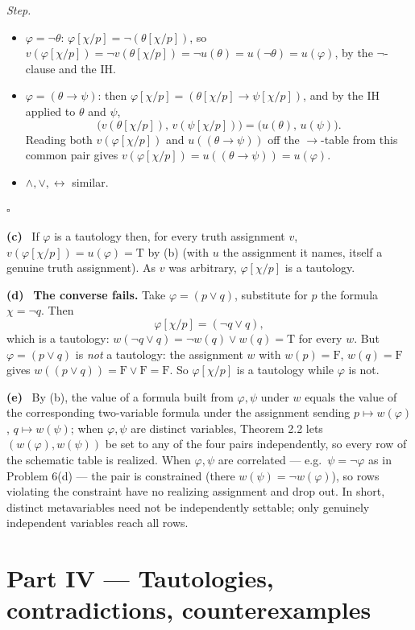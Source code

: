 \documentclass[11pt]{article}
\newcommand{\T}{\mathrm{T}}
\newcommand{\F}{\mathrm{F}}
\newcommand{\solpart}[1]{\smallskip\noindent\textbf{(#1)}\ }
\begin{document}
\emph{Step.}
\begin{itemize}[nosep]
\item $\varphi=\lnot\theta$: $\varphi[\chi/p]=\lnot(\theta[\chi/p])$, so
$v(\varphi[\chi/p])=\lnot v(\theta[\chi/p])=\lnot u(\theta)=u(\lnot\theta)=
u(\varphi)$, by the $\lnot$-clause and the IH.
\item $\varphi=(\theta\to\psi)$: then $\varphi[\chi/p]=(\theta[\chi/p]\to
\psi[\chi/p])$, and by the IH applied to $\theta$ and $\psi$,
\[
\big(v(\theta[\chi/p]),\,v(\psi[\chi/p])\big)=\big(u(\theta),\,u(\psi)\big).
\]
Reading both $v(\varphi[\chi/p])$ and $u((\theta\to\psi))$ off the $\to$-table from
this common pair gives $v(\varphi[\chi/p])=u((\theta\to\psi))=u(\varphi)$.
\item $\land,\lor,\leftrightarrow$ similar.
\end{itemize}
\hfill$\square$

\solpart{c} If $\varphi$ is a tautology then, for every truth assignment $v$,
$v(\varphi[\chi/p])=u(\varphi)=\T$ by (b) (with $u$ the assignment it names, itself
a genuine truth assignment). As $v$ was arbitrary, $\varphi[\chi/p]$ is a
tautology.

\solpart{d} \textbf{The converse fails.} Take $\varphi=(p\lor q)$, substitute for
$p$ the formula $\chi=\lnot q$. Then
\[
\varphi[\chi/p]=(\lnot q\lor q),
\]
which is a tautology: $w(\lnot q\lor q)=\lnot w(q)\lor w(q)=\T$ for every $w$. But
$\varphi=(p\lor q)$ is \emph{not} a tautology: the assignment $w$ with $w(p)=\F$,
$w(q)=\F$ gives $w((p\lor q))=\F\lor\F=\F$. So $\varphi[\chi/p]$ is a tautology
while $\varphi$ is not.

\solpart{e} By (b), the value of a formula built from $\varphi,\psi$ under $w$
equals the value of the corresponding two-variable formula under the assignment
sending $p\mapsto w(\varphi)$, $q\mapsto w(\psi)$; when $\varphi,\psi$ are distinct
variables, Theorem 2.2 lets $(w(\varphi),w(\psi))$ be set to any of the four pairs
independently, so every row of the schematic table is realized. When $\varphi,\psi$
are correlated --- e.g.\ $\psi=\lnot\varphi$ as in Problem 6(d) --- the pair is
constrained (there $w(\psi)=\lnot w(\varphi)$), so rows violating the constraint
have no realizing assignment and drop out. In short, distinct metavariables need
not be independently settable; only genuinely independent variables reach all rows.

\section*{Part IV --- Tautologies, contradictions, counterexamples}
\end{document}
